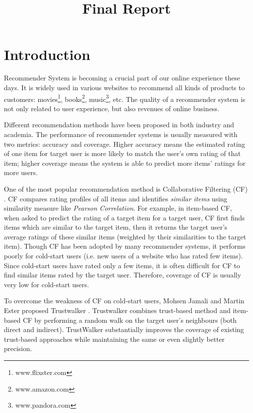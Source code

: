\documentclass[12pt]{article}
\title{Final Report}
\author{}
\begin{document}
\maketitle

\section{Introduction}
Recommender System is becoming a crucial part of our online experience these days. It is widely used in various websites to recommend all kinds of products to customers: movies\footnote[1]{www.flixster.com}, books\footnote[2]{www.amazon.com}, music\footnote[3]{www.pandora.com}, etc. The quality of a recommender system is not only related to user experience, but also revenues of online business.  

Different recommendation methods have been proposed in both industry and academia. The performance of recommender systems is usually measured with two metrics: accuracy and coverage. Higher accuracy means the estimated rating of one item for target user is more likely to match the user's own rating of that item; higher coverage means the system is able to predict more items' ratings for more users. 

One of the most popular recommendation method is Collaborative Filtering (CF) \cite{Sarwar:2001p125}. CF compares rating profiles of all items and identifies \emph{similar items} using similarity measure like \emph{Pearson Correlation}. For example, in item-based CF, when asked to predict the rating of a target item for a target user, CF first finds items which are similar to the target item, then it returns the target user's average ratings of these similar items (weighted by their similarities to the target item). Though CF has been adopted by many recommender systems, it performs poorly for cold-start users (i.e. new users of a website who has rated few items). Since cold-start users have rated only a few items, it is often difficult for CF to find similar items rated by the target user. Therefore, coverage of CF is usually very low for cold-start users. 

To overcome the weakness of CF on cold-start users, Mohsen Jamali and Martin Ester proposed Trustwalker \cite{Jamali:2009p67}. Trustwalker combines trust-based method and item-based CF by performing a random walk on the target user's neighbours (both direct and indirect). TrustWalker substantially improves the coverage of existing trust-based approaches while maintaining the same or even slightly better precision.
\end{document}
